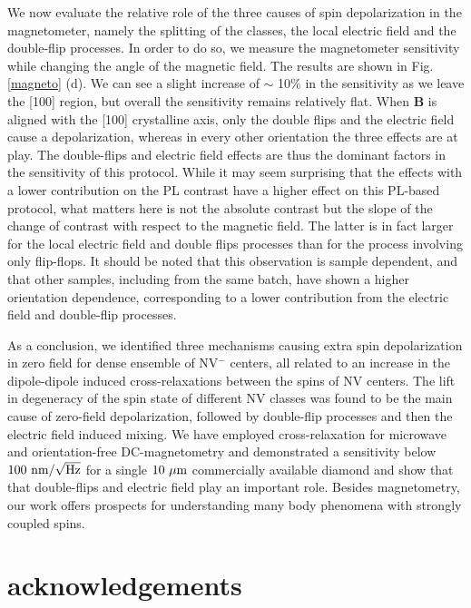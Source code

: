 \documentclass[preprintnumbers,amsmath,amssymb,superscriptaddress,twocolumn,showpacs]{revtex4-2}
\begin{document}
We now evaluate the relative role of the three causes of spin depolarization in the magnetometer, namely the splitting of the classes, the local electric field and the double-flip processes. In order to do so, we measure the magnetometer sensitivity while changing the angle of the magnetic field.  The results are shown in Fig. \ref{magneto} (d). We can see a slight increase of $\sim$ 10\% in the sensitivity as we leave the [100] region, but overall the sensitivity remains relatively flat. 
When $\bm B$ is aligned with the [100] crystalline axis, only the double flips and the electric field cause a depolarization, whereas in every other orientation the three effects are at play.
The double-flips and electric field effects are thus the dominant factors in the sensitivity of this protocol. While it may seem surprising that the effects with a lower contribution on the PL contrast have a higher effect on this PL-based protocol, what matters here is not the absolute contrast but the slope of the change of contrast with respect to the magnetic field. The latter is in fact larger for the local electric field and double flips processes than for the process involving only flip-flops. 
It should be noted that this observation is sample dependent, and that other samples, including from the same batch, have shown a higher orientation dependence, corresponding to a lower contribution from the electric field and double-flip processes.

As a conclusion, we identified three mechanisms causing extra spin depolarization in zero field for dense ensemble of NV$^-$ centers, all related to an increase in the dipole-dipole induced cross-relaxations between the spins of NV centers. The lift in degeneracy of the spin state of different NV classes was found to be the main cause of zero-field depolarization, followed by double-flip processes and then the electric field induced mixing. We have employed cross-relaxation for microwave and orientation-free DC-magnetometry and demonstrated a sensitivity below $100\ \rm{nm}/\sqrt{\rm Hz}$ for a single $10\ \mu \rm m$ commercially available diamond and show that that double-flips and electric field play an important role.
Besides magnetometry, our work offers prospects for understanding many body phenomena with strongly coupled spins. 

\section*{acknowledgements}


{}
\end{document}
